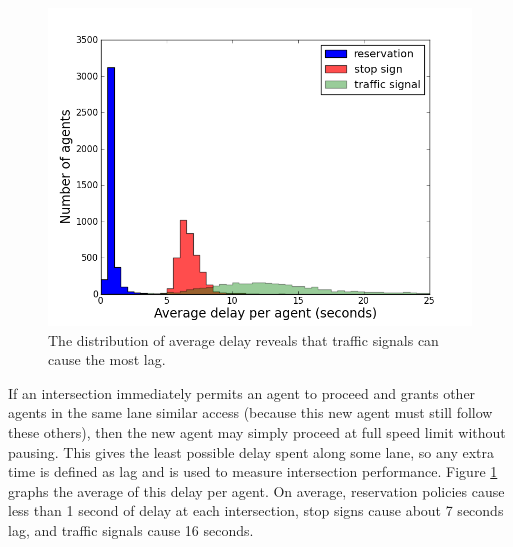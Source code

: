 \documentclass[letterpaper, 10 pt, conference]{ieeeconf}  %
\begin{document}
\begin{figure}[h]
  \centering \includegraphics[width=\linewidth]{avg_lag_agent_atx.png}
  \caption{The distribution of average delay reveals that traffic signals can
           cause the most lag.}
  \label{fig:avg_lag}
  \vspace{-10pt}
\end{figure}

If an intersection immediately permits an agent to proceed and grants other
agents in the same lane similar access (because this new agent must still follow
these others), then the new agent may simply proceed at full speed limit without
pausing. This gives the least possible delay spent along some lane, so any extra
time is defined as lag and is used to measure intersection performance. Figure
\ref{fig:avg_lag} graphs the average of this delay per agent. On average,
reservation policies cause less than 1 second of delay at each intersection,
stop signs cause about 7 seconds lag, and traffic signals cause 16 seconds.

\end{document}
